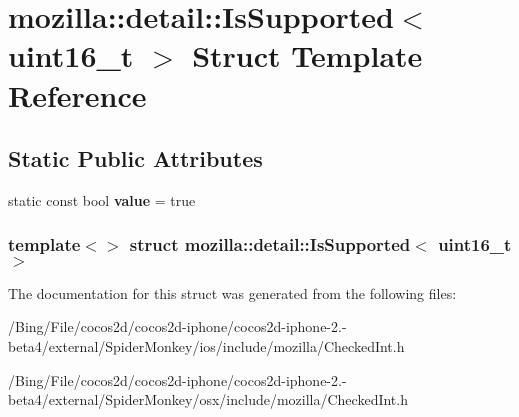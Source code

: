 \hypertarget{structmozilla_1_1detail_1_1_is_supported_3_01uint16__t_01_4}{\section{mozilla\-:\-:detail\-:\-:Is\-Supported$<$ uint16\-\_\-t $>$ Struct Template Reference}
\label{structmozilla_1_1detail_1_1_is_supported_3_01uint16__t_01_4}
}
\subsection*{Static Public Attributes}
\begin{DoxyCompactItemize}
\item 
\hypertarget{structmozilla_1_1detail_1_1_is_supported_3_01uint16__t_01_4_a00b4745fa87664a882c6679aab93451d}{static const bool {\bfseries value} = true}\label{structmozilla_1_1detail_1_1_is_supported_3_01uint16__t_01_4_a00b4745fa87664a882c6679aab93451d}

\end{DoxyCompactItemize}
\subsubsection*{template$<$$>$ struct mozilla\-::detail\-::\-Is\-Supported$<$ uint16\-\_\-t $>$}



The documentation for this struct was generated from the following files\-:\begin{DoxyCompactItemize}
\item 
/\-Bing/\-File/cocos2d/cocos2d-\/iphone/cocos2d-\/iphone-\/2.-\/beta4/external/\-Spider\-Monkey/ios/include/mozilla/Checked\-Int.\-h\item 
/\-Bing/\-File/cocos2d/cocos2d-\/iphone/cocos2d-\/iphone-\/2.-\/beta4/external/\-Spider\-Monkey/osx/include/mozilla/Checked\-Int.\-h\end{DoxyCompactItemize}

